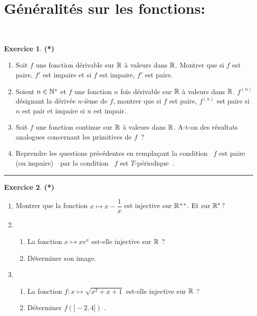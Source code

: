 \documentclass[a4paper,11pt]{article}
\theoremstyle{definition}
\newtheorem{exo}{Exercice} %
\begin{document}
 	
	

\noindent{}
\bigskip


\raggedright

\section*{Généralités sur les fonctions:}\hfill\\%

\begin{minipage}{1\linewidth}
	\begin{minipage}[t]{0.48\linewidth}
		\raggedright
	
\begin{exo}\textbf{(*)}\quad\\[0.2cm]
	\begin{enumerate}
		\item  Soit $f$ une fonction dérivable sur $\mathbb{R}$ à valeurs dans $\mathbb{R}$. Montrer que si $f$ est paire, $f'$ est
		impaire et si $f$ est impaire, $f'$ est paire.
		\item  Soient $n\in\mathbb{N}^*$ et $f$ une fonction $n$ fois dérivable sur $\mathbb{R}$ à valeurs dans $\mathbb{R}$. $f^{(n)}$
		désignant la dérivée $n$-ième de $f$, montrer que si $f$ est paire, $f^{(n)}$ est paire si $n$ est pair et impaire si
		$n$ est impair.
		\item  Soit $f$ une fonction continue sur $\mathbb{R}$ à valeurs dans $\mathbb{R}$. A-t-on des résultats analogues concernant les
		primitives de $f$~?
		\item  Reprendre les questions précédentes en remplaçant la condition \og~$f$ est paire (ou impaire)~\fg~par la
		condition \og~$f$ est $T$-périodique~\fg.
	\end{enumerate}
	
	\centering
	\rule{1\linewidth}{0.6pt}
\end{exo}


		\begin{exo}\textbf{(*)}\quad\\[0.2cm]
	\begin{enumerate}
		\item Montrer que la fonction $x \longmapsto x-\dfrac{1}{x}$ est injective
		sur $\mathbb{R}^{+*}$. Et sur $\mathbb{R}^*$?
		\item\begin{enumerate}
			\item La fonction $x \longmapsto xe^x$ est-elle injective sur $\mathbb{R}$ ?
			\item Déterminer son image.
		\end{enumerate}
		\item \begin{enumerate}
			\item La fonction $f : x \longmapsto \sqrt{x^2+x+1}$ est-elle injective
			sur $\mathbb{R}$ ?
			\item Déterminer $f(] - 2, 4])$ .
		\end{enumerate}
	\end{enumerate}
	

\end{exo}
\end{minipage}
\end{minipage}
\end{document}

